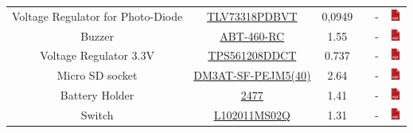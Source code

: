 \documentclass[12pt,a4paper,landscape]{article}
\begin{document}
{\begin{tabular}{|c|c|c|c|c|c|}
					Voltage Regulator for Photo-Diode &
					\href{http://fr.farnell.com/texas-instruments/tlv73318pdbvt/regulateur-ldo-0-3a-1-8v-sot-23/dp/2455141}
					{TLV73318PDBVT} & 0,0949 & &
					- &
					\href{http://www.ti.com/lit/ds/symlink/tlv733p.pdf}{\includegraphics[height=1em]{pdf.png}}\\

					Buzzer &
					\href{http://fr.farnell.com/pro-signal/abt-460-rc/buzzer-electro-m-canique-2v-4v/dp/2783902}
					{ABT-460-RC} & 1.55 & &
					- & \href{http://www.farnell.com/datasheets/2362849.pdf}{\includegraphics[height=1em]{pdf.png}}\\
					    
					Voltage Regulator 3.3V &
					\href{http://fr.farnell.com/texas-instruments/tps561208ddct/dc-dc-conv-sync-buck-580khz-sot/dp/2766883}
					{TPS561208DDCT} &  0.737 & &
					- &
					\href{http://www.ti.com/lit/ds/symlink/tps561201.pdf}{\includegraphics[height=1em]{pdf.png}}\\
					    
					Micro SD socket &
					\href{http://fr.farnell.com/hirose-hrs/dm3at-sf-pejm5-40/connecteur-micro-sd-push-push/dp/1764374}
					{DM3AT-SF-PEJM5(40)} & 2.64 & &
					- &
					\href{http://www.farnell.com/datasheets/1697167.pdf}{\includegraphics[height=1em]{pdf.png}}\\
					    
					Battery Holder &
					\href{http://fr.farnell.com/keystone/2477/battery-holder-pcb/dp/1650684}
					{2477} & 1.41 & &
					- &
					\href{http://www.farnell.com/datasheets/1703957.pdf}{\includegraphics[height=1em]{pdf.png}}\\
					    
					Switch &
					\href{http://fr.farnell.com/c-k-components/l102011ms02q/commutateur-lateral-spdt/dp/2435160}
					{L102011MS02Q} & 1.31 & &
					- &
					\href{http://www.farnell.com/datasheets/1839859.pdf}{\includegraphics[height=1em]{pdf.png}}\\


\end{tabular}}
\end{document}
